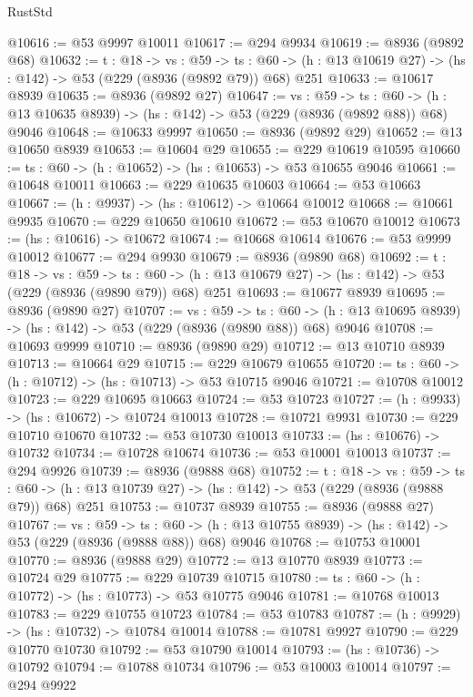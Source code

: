 \begin{lexlean}{RustStd}
\begin{coremodule}
@10616 := @53 @9997 @10011
@10617 := @294 @9934
@10619 := @8936 (@9892 @68)
@10632 := {t : @18} ->
  {vs : @59} ->
  {ts : @60} -> (h : @13 @10619 @27) -> (hs : @142) -> @53 (@229 (@8936 (@9892 @79)) @68) @251
@10633 := @10617 @8939
@10635 := @8936 (@9892 @27)
@10647 := {vs : @59} ->
  {ts : @60} -> (h : @13 @10635 @8939) -> (hs : @142) -> @53 (@229 (@8936 (@9892 @88)) @68) @9046
@10648 := @10633 @9997
@10650 := @8936 (@9892 @29)
@10652 := @13 @10650 @8939
@10653 := @10604 @29
@10655 := @229 @10619 @10595
@10660 := {ts : @60} -> (h : @10652) -> (hs : @10653) -> @53 @10655 @9046
@10661 := @10648 @10011
@10663 := @229 @10635 @10603
@10664 := @53 @10663
@10667 := (h : @9937) -> (hs : @10612) -> @10664 @10012
@10668 := @10661 @9935
@10670 := @229 @10650 @10610
@10672 := @53 @10670 @10012
@10673 := (hs : @10616) -> @10672
@10674 := @10668 @10614
@10676 := @53 @9999 @10012
@10677 := @294 @9930
@10679 := @8936 (@9890 @68)
@10692 := {t : @18} ->
  {vs : @59} ->
  {ts : @60} -> (h : @13 @10679 @27) -> (hs : @142) -> @53 (@229 (@8936 (@9890 @79)) @68) @251
@10693 := @10677 @8939
@10695 := @8936 (@9890 @27)
@10707 := {vs : @59} ->
  {ts : @60} -> (h : @13 @10695 @8939) -> (hs : @142) -> @53 (@229 (@8936 (@9890 @88)) @68) @9046
@10708 := @10693 @9999
@10710 := @8936 (@9890 @29)
@10712 := @13 @10710 @8939
@10713 := @10664 @29
@10715 := @229 @10679 @10655
@10720 := {ts : @60} -> (h : @10712) -> (hs : @10713) -> @53 @10715 @9046
@10721 := @10708 @10012
@10723 := @229 @10695 @10663
@10724 := @53 @10723
@10727 := (h : @9933) -> (hs : @10672) -> @10724 @10013
@10728 := @10721 @9931
@10730 := @229 @10710 @10670
@10732 := @53 @10730 @10013
@10733 := (hs : @10676) -> @10732
@10734 := @10728 @10674
@10736 := @53 @10001 @10013
@10737 := @294 @9926
@10739 := @8936 (@9888 @68)
@10752 := {t : @18} ->
  {vs : @59} ->
  {ts : @60} -> (h : @13 @10739 @27) -> (hs : @142) -> @53 (@229 (@8936 (@9888 @79)) @68) @251
@10753 := @10737 @8939
@10755 := @8936 (@9888 @27)
@10767 := {vs : @59} ->
  {ts : @60} -> (h : @13 @10755 @8939) -> (hs : @142) -> @53 (@229 (@8936 (@9888 @88)) @68) @9046
@10768 := @10753 @10001
@10770 := @8936 (@9888 @29)
@10772 := @13 @10770 @8939
@10773 := @10724 @29
@10775 := @229 @10739 @10715
@10780 := {ts : @60} -> (h : @10772) -> (hs : @10773) -> @53 @10775 @9046
@10781 := @10768 @10013
@10783 := @229 @10755 @10723
@10784 := @53 @10783
@10787 := (h : @9929) -> (hs : @10732) -> @10784 @10014
@10788 := @10781 @9927
@10790 := @229 @10770 @10730
@10792 := @53 @10790 @10014
@10793 := (hs : @10736) -> @10792
@10794 := @10788 @10734
@10796 := @53 @10003 @10014
@10797 := @294 @9922

\end{coremodule}
\end{lexlean}
